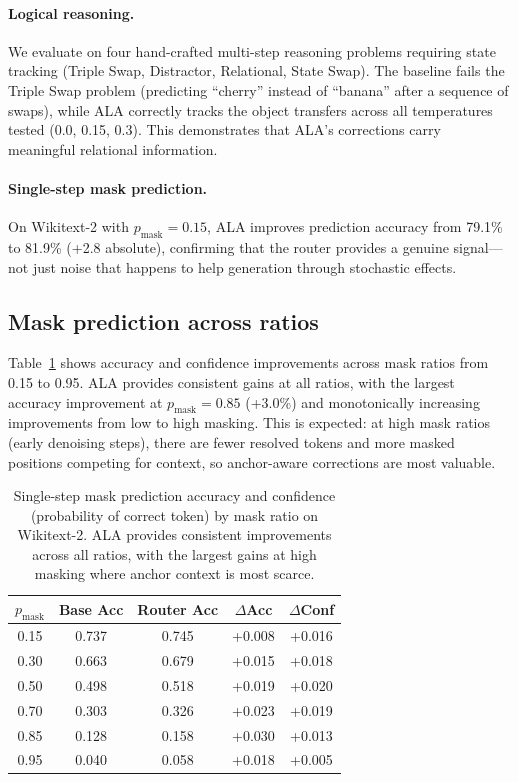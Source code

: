 \documentclass{article} %
\newcommand{\pmask}{p_{\text{mask}}}
\begin{document}
\paragraph{Logical reasoning.}
We evaluate on four hand-crafted multi-step reasoning problems requiring state tracking (Triple Swap, Distractor, Relational, State Swap).
The baseline fails the Triple Swap problem (predicting ``cherry'' instead of ``banana'' after a sequence of swaps), while ALA correctly tracks the object transfers across all temperatures tested (0.0, 0.15, 0.3).
This demonstrates that ALA's corrections carry meaningful relational information.

\paragraph{Single-step mask prediction.}
On Wikitext-2 with $\pmask{=}0.15$, ALA improves prediction accuracy from 79.1\% to 81.9\% (+2.8 absolute), confirming that the router provides a genuine signal---not just noise that happens to help generation through stochastic effects.

\subsection{Mask prediction across ratios}

Table~\ref{tab:maskratio} shows accuracy and confidence improvements across mask ratios from 0.15 to 0.95.
ALA provides consistent gains at all ratios, with the largest accuracy improvement at $\pmask{=}0.85$ (+3.0\%) and monotonically increasing improvements from low to high masking.
This is expected: at high mask ratios (early denoising steps), there are fewer resolved tokens and more masked positions competing for context, so anchor-aware corrections are most valuable.

\begin{table}[t]
\begin{center}
\begin{tabular}{ccccc}
\toprule
$\pmask$ & Base Acc & Router Acc & $\Delta$Acc & $\Delta$Conf \\
\midrule
0.15 & 0.737 & 0.745 & +0.008 & +0.016 \\
0.30 & 0.663 & 0.679 & +0.015 & +0.018 \\
0.50 & 0.498 & 0.518 & +0.019 & +0.020 \\
0.70 & 0.303 & 0.326 & +0.023 & +0.019 \\
0.85 & 0.128 & 0.158 & +0.030 & +0.013 \\
0.95 & 0.040 & 0.058 & +0.018 & +0.005 \\
\bottomrule
\end{tabular}
\end{center}
\caption{Single-step mask prediction accuracy and confidence (probability of correct token) by mask ratio on Wikitext-2. ALA provides consistent improvements across all ratios, with the largest gains at high masking where anchor context is most scarce.}\label{tab:maskratio}
\end{table}
\end{document}
